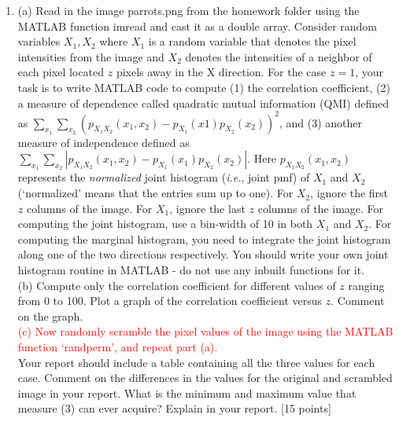 \documentclass[11pt]{article}
\begin{document}
\begin{enumerate}
\item (a) Read in the image parrots.png from the homework folder using the MATLAB function imread and cast it as a double array. Consider random variables $X_1, X_2$ where $X_1$ is a random variable that denotes the pixel intensities from the image and $X_2$ denotes the intensities of a neighbor of each pixel located $z$ pixels away in the X direction. For the case $z = 1$, your task is to write MATLAB code to compute (1) the correlation coefficient, (2) a measure of dependence called quadratic mutual information (QMI) defined as $\sum_{x_1}\sum_{x_2} (p_{X_1 X_2}(x_1,x_2)-p_{X_1}(x1)p_{X_2}(x_2))^2$, and (3) another measure of independence defined as $\sum_{x_1}\sum_{x_2} |p_{X_1 X_2}(x_1,x_2)-p_{X_1}(x_1)p_{X_2}(x_2)|$. Here $p_{X_1 X_2}(x_1,x_2)$ represents the \emph{normalized} joint histogram (\textit{i.e.}, joint pmf) of $X_1$ and $X_2$ (`normalized' means that the entries sum up to one). For $X_2$, ignore the first $z$ columns of the image. For $X_1$, ignore the last $z$ columns of the image. For computing the joint histogram, use a bin-width of 10 in both $X_1$ and $X_2$. For computing the marginal histogram, you need to integrate the joint histogram along one of the two directions respectively. You should write your own joint histogram routine in MATLAB - do not use any inbuilt functions for it. 
\\
(b) Compute only the correlation coefficient for different values of $z$ ranging from 0 to 100. Plot a graph of the correlation coefficient versus $z$. Comment on the graph.
\\
\textcolor{red}{(c) Now randomly scramble the pixel values of the image using the MATLAB function `randperm', and repeat part (a).}
\\
Your report should include a table containing all the three values for each case. Comment on the differences in the values for the original and scrambled image in your report. What is the minimum and maximum value that measure (3) can ever acquire? Explain in your report. \textsf{[15 points]}

\end{enumerate}
\end{document}
